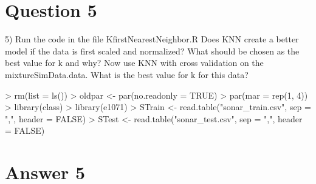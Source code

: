 \documentclass{article}
\begin{document}
\section*{Question 5}

5) Run the code in the file KfirstNearestNeighbor.R Does KNN create a better
model if the data is first scaled and normalized? What should be chosen as
the best value for k and why? Now use KNN with cross validation on the
mixtureSimData.data. What is the best value for k for this data?

\begin{Schunk}
\begin{Sinput}
> rm(list = ls())
> oldpar <- par(no.readonly = TRUE)
> par(mar = rep(1, 4))
> library(class)
> library(e1071)
> STrain <- read.table("sonar_train.csv", sep = ",", header = FALSE)
> STest <- read.table("sonar_test.csv", sep = ",", header = FALSE)
\end{Sinput}
\end{Schunk}

\section*{Answer  5}
\end{document}
